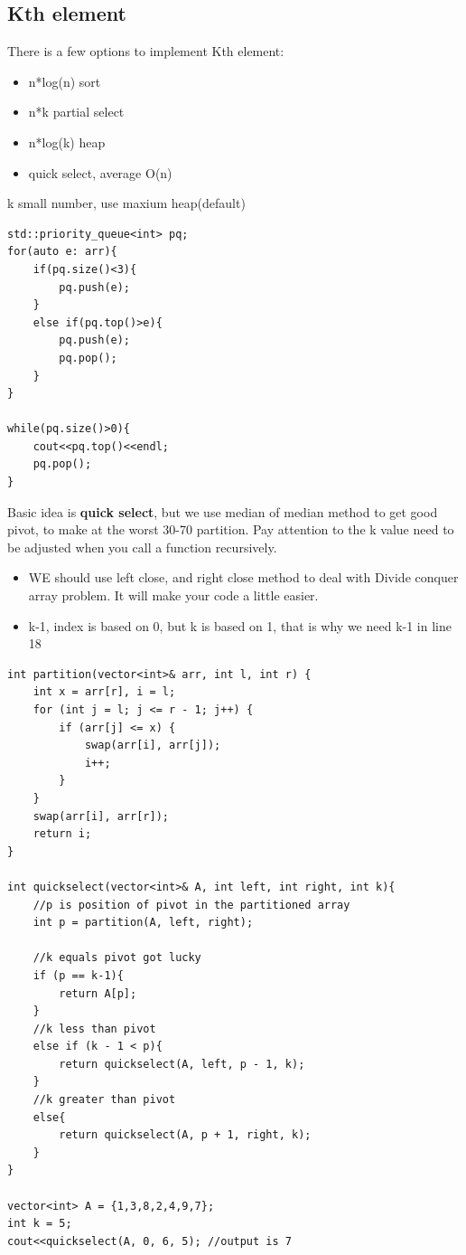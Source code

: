 \documentclass[a4paper,11pt,twoside]{book}
\begin{document}
\subsection{Kth element}

	\par There is a few options to implement Kth element:
	\begin{itemize}
		\item n*log(n) sort
		\item n*k partial select
		\item n*log(k) heap 
		\item quick select, average O(n)
	\end{itemize}

\par k small number, use maxium heap(default)
\begin{lstlisting}
std::priority_queue<int> pq;
for(auto e: arr){
	if(pq.size()<3){
		pq.push(e);
	}
	else if(pq.top()>e){
		pq.push(e);
		pq.pop();
	}
}

while(pq.size()>0){
	cout<<pq.top()<<endl;
	pq.pop();
}		
\end{lstlisting}

	\par Basic idea is \textbf{quick select}, but we use median of median method to get good pivot, to make at the worst 30-70 partition. Pay attention to the k value need to be adjusted when you call a function recursively. 
	
\begin{itemize}
	\item WE should use left close, and right close method to deal with Divide conquer array problem. It will make your code a little easier. 
	
	\item k-1, index is based on 0, but k is based on 1, that is why we need k-1 in line 18
\end{itemize}	
	
\begin{lstlisting}
int partition(vector<int>& arr, int l, int r) {
	int x = arr[r], i = l;
	for (int j = l; j <= r - 1; j++) {
		if (arr[j] <= x) {
			swap(arr[i], arr[j]);
			i++;
		}
	}
	swap(arr[i], arr[r]);
	return i;
}

int quickselect(vector<int>& A, int left, int right, int k){
	//p is position of pivot in the partitioned array
	int p = partition(A, left, right);
	
	//k equals pivot got lucky
	if (p == k-1){
		return A[p];
	}
	//k less than pivot
	else if (k - 1 < p){
		return quickselect(A, left, p - 1, k);
	}
	//k greater than pivot
	else{
		return quickselect(A, p + 1, right, k);
	}
}

vector<int> A = {1,3,8,2,4,9,7};
int k = 5;
cout<<quickselect(A, 0, 6, 5); //output is 7
\end{lstlisting}
	
\end{document}

